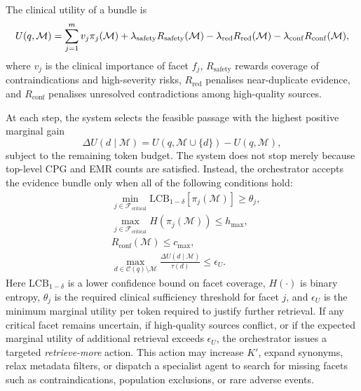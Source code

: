 \documentclass[conference]{IEEEtran}
\begin{document}
The clinical utility of a bundle is
\begin{equation}
\label{eq:clinical-utility}
\tiny
U(q,\mathcal{M}) = \sum_{j=1}^{m} v_j \pi_j(\mathcal{M}) + \lambda_{\mathrm{safety}} R_{\mathrm{safety}}(\mathcal{M}) - \lambda_{\mathrm{red}} R_{\mathrm{red}}(\mathcal{M}) - \lambda_{\mathrm{conf}} R_{\mathrm{conf}}(\mathcal{M}),
\end{equation}
where $v_j$ is the clinical importance of facet $f_j$, $R_{\mathrm{safety}}$ rewards coverage of contraindications and high-severity risks, $R_{\mathrm{red}}$ penalises near-duplicate evidence, and $R_{\mathrm{conf}}$ penalises unresolved contradictions among high-quality sources.

At each step, the system selects the feasible passage with the highest positive marginal gain 
\begin{equation}
\label{eq:marginal-utility}
\Delta U(d\mid\mathcal{M})
=
U(q,\mathcal{M}\cup\{d\})-U(q,\mathcal{M}),
\end{equation}
subject to the remaining token budget. The system does not stop merely because top-level CPG and EMR counts are satisfied. Instead, the orchestrator accepts the evidence bundle only when all of the following conditions hold:
\begin{equation}
\label{eq:stopping}
\begin{aligned}
&\min_{j\in\mathcal{F}_{\mathrm{critical}}}
\mathrm{LCB}_{1-\delta}\!\left[\pi_j(\mathcal{M})\right]
\ge \theta_j,
\\
&\max_{j\in\mathcal{F}_{\mathrm{critical}}}
H\!\left(\pi_j(\mathcal{M})\right)
\le h_{\max},
\\
&R_{\mathrm{conf}}(\mathcal{M})\le c_{\max},
\\
&\max_{d\in\mathcal{C}(q)\setminus\mathcal{M}}
\frac{\Delta U(d\mid\mathcal{M})}{\tau(d)}
\le \epsilon_U.
\end{aligned}
\end{equation}
Here $\mathrm{LCB}_{1-\delta}$ is a lower confidence bound on facet coverage, $H(\cdot)$ is binary entropy, $\theta_j$ is the required clinical sufficiency threshold for facet $j$, and $\epsilon_U$ is the minimum marginal utility per token required to justify further retrieval. If any critical facet remains uncertain, if high-quality sources conflict, or if the expected marginal utility of additional retrieval exceeds $\epsilon_U$, the orchestrator issues a targeted \textit{retrieve-more} action. This action may increase $K'$, expand synonyms, relax metadata filters, or dispatch a specialist agent to search for missing facets such as contraindications, population exclusions, or rare adverse events.
\end{document}
